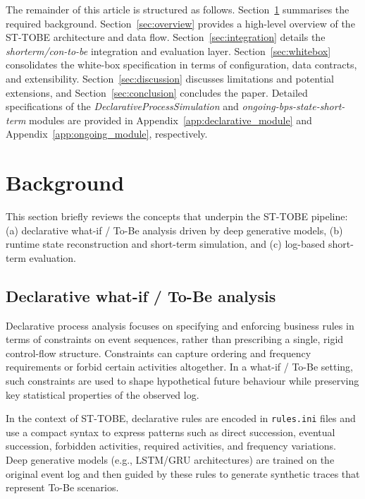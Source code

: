 \documentclass[a4paper,fleqn]{cas-sc}
\begin{document}
The remainder of this article is structured as follows.
Section~\ref{sec:background} summarises the required background.
Section~\ref{sec:overview} provides a high-level overview of the
ST-TOBE architecture and data flow.
Section~\ref{sec:integration} details the
\emph{shorterm/con-to-be} integration and evaluation layer.
Section~\ref{sec:whitebox} consolidates the white-box
specification in terms of configuration, data contracts, and
extensibility.
Section~\ref{sec:discussion} discusses limitations and potential
extensions, and Section~\ref{sec:conclusion} concludes the paper.
Detailed specifications of the \emph{DeclarativeProcessSimulation}
and \emph{ongoing-bps-state-short-term} modules are provided in
Appendix~\ref{app:declarative_module} and Appendix~\ref{app:ongoing_module},
respectively.

\section{Background}
\label{sec:background}

This section briefly reviews the concepts that underpin the
ST-TOBE pipeline: 
(a) declarative what-if / To-Be analysis driven by deep
generative models, 
(b) runtime state reconstruction and short-term simulation, and 
(c) log-based short-term evaluation.

\subsection{Declarative what-if / To-Be analysis}

Declarative process analysis focuses on specifying and
enforcing business rules in terms of constraints on event
sequences, rather than prescribing a single, rigid control-flow
structure.
Constraints can capture ordering and frequency requirements or
forbid certain activities altogether.
In a what-if / To-Be setting, such constraints are used to
shape hypothetical future behaviour while preserving key
statistical properties of the observed log.

In the context of ST-TOBE, declarative rules are encoded in
\verb|rules.ini| files and use a compact syntax to express
patterns such as direct succession, eventual succession, forbidden
activities, required activities, and frequency variations.
Deep generative models (e.g., LSTM/GRU architectures) are trained
on the original event log and then guided by these rules to
generate synthetic traces that represent To-Be scenarios.
\end{document}
